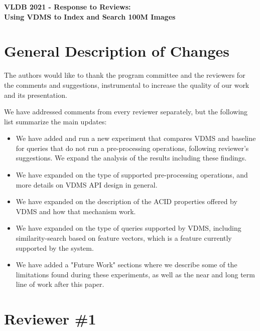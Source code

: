 \documentclass[11pt]{proposalnsf}
\begin{document}
\begin{center}
{\Large{\bf VLDB 2021 - Response to Reviews: \\
Using VDMS to Index and Search 100M Images}}

\end{center}

\section{General Description of Changes}

The authors would like to thank the program committee and the reviewers
for the comments and suggestions,
instrumental to increase the quality of our work and its presentation.

We have addressed comments from every reviewer separately, but the following
list summarize the main updates:

\begin{itemize}
  \item We have added and run a new experiment that compares VDMS and baseline
        for queries that do not run a pre-processing operations, following
        reviewer's suggestions.
        We expand the analysis of the results including these findings.
  \item We have expanded on the type of supported pre-processing
        operations, and more details on VDMS API design in general.
  \item We have expanded on the description of the ACID properties offered
        by VDMS and how that mechanism work.
  \item We have expanded on the type of queries supported by VDMS,
        including similarity-search based on feature vectors,
        which is a feature currently supported by the system.
  \item We have added a "Future Work" sections where we describe some
        of the limitations found during these experiments, as well as the
        near and long term line of work after this paper.
\end{itemize}

\section{Reviewer \#1}
\end{document}
